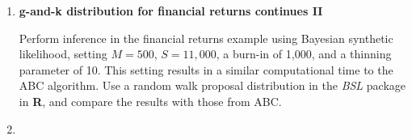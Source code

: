 \begin{enumerate}

	\item \textbf{g-and-k distribution for financial returns continues II}
	
	Perform inference in the financial returns example using Bayesian synthetic likelihood, setting $M=500$, $S=11,000$, a burn-in of 1,000, and a thinning parameter of 10. This setting results in a similar computational time to the ABC algorithm. Use a random walk proposal distribution in the \textit{BSL} package in \textbf{R}, and compare the results with those from ABC.  
	
	
\item 
	
\end{enumerate}

